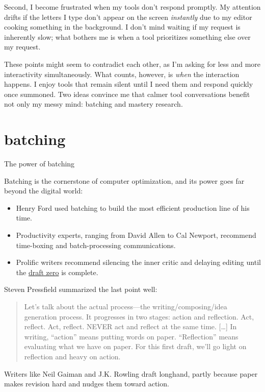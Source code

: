 \documentclass{article}
\begin{document}
Second, I become frustrated when my tools don’t respond promptly.
My attention drifts if the letters I type don't appear on the screen \emph{instantly}
due to my editor cooking something in the background.
I don't mind waiting if my request is inherently slow;
what bothers me is when a tool prioritizes something else over my request.

These points might seem to contradict each other,
as I'm asking for less and more interactivity simultaneously.
What counts, however, is \emph{when} the interaction happens.
I enjoy tools that remain silent until I need them
and respond quickly once summoned.
Two ideas convince me that calmer tool conversations benefit not only my messy mind:
batching and mastery research.

\section{batching}{The power of batching}

Batching is the cornerstone of computer optimization,
and its power goes far beyond the digital world:
\begin{itemize}
\item Henry Ford used batching to build the most efficient production line of his time.
\item Productivity experts, ranging from David Allen to Cal Newport,
recommend time-boxing and batch-processing communications.
\item Prolific writers recommend silencing the inner critic and delaying editing
until the \href{https://blog.reedsy.com/live/draft-zero-sj-watson/}{draft zero} is complete.
\end{itemize}

Steven Pressfield summarized the last point well:
  
\blockquote{
  Let's talk about the actual process—the writing/composing/idea generation process.
  It progresses in two stages: action and reflection.
  Act, reflect. Act, reflect.
  NEVER act and reflect at the same time. [\ldots]
  In writing, ``action'' means putting words on paper.
  ``Reflection'' means evaluating what we have on paper.
  For this first draft,
  we'll go light on reflection and heavy on action.
}{}


Writers like Neil Gaiman and J.K. Rowling draft longhand,
partly because paper makes revision hard and nudges them toward action.
\end{document}

